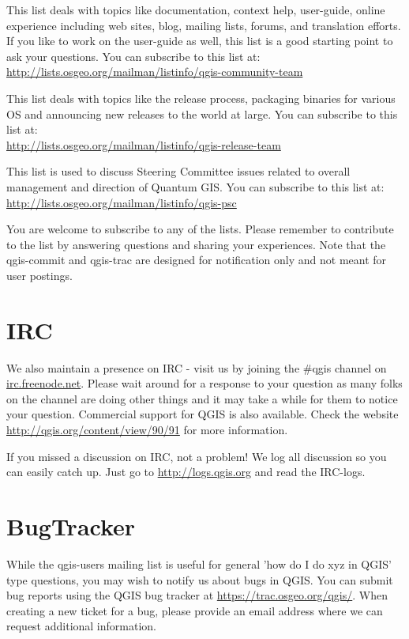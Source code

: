 This list deals with topics like documentation, context help, user-guide,
online experience including web sites, blog, mailing lists, forums, and
translation efforts. If you like to work on the user-guide as well, this list
is a good starting point to ask your questions. You can subscribe to this
list at:\\
\url{http://lists.osgeo.org/mailman/listinfo/qgis-community-team}

This list deals with topics like the release process, packaging binaries for
various OS and announcing new releases to the world at large. You can
subscribe to this list at:\\
\url{http://lists.osgeo.org/mailman/listinfo/qgis-release-team}

This list is used to discuss Steering Committee issues related to overall
management and direction of Quantum GIS. You can subscribe to this list at:\\
\url{http://lists.osgeo.org/mailman/listinfo/qgis-psc}

You are welcome to subscribe to any of the lists. Please remember to
contribute to the list by answering questions and sharing your experiences.
Note that the qgis-commit and qgis-trac are designed for notification only
and not meant for user postings. 

\section{IRC}
We also maintain a presence on IRC - visit us by joining the \#qgis channel on
\url{irc.freenode.net}. Please wait around for a response to your question as many
folks on the channel are doing other things and it may take a while for them to
notice your question. Commercial support for QGIS is also available.
Check the website \url{http://qgis.org/content/view/90/91} for more information.

If you missed a discussion on IRC, not a problem! We log all discussion so you can 
easily catch up. Just go to \url{http://logs.qgis.org} and read the IRC-logs.

\section{BugTracker}
While the qgis-users mailing list is useful for general 'how do I do xyz in
QGIS' type questions, you may wish to notify us about bugs in QGIS. You can
submit bug reports using the QGIS bug tracker at \url{https://trac.osgeo.org/qgis/}. 
When creating a new ticket for a bug, please provide an email
address where we can request additional information.

